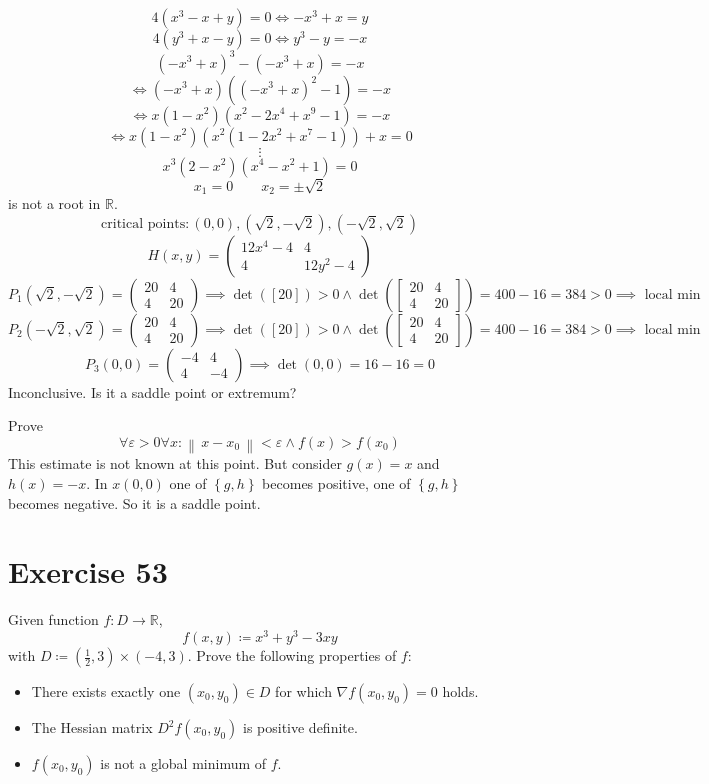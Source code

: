 \documentclass[a4paper]{article}
\theoremstyle{definition}
\newcommand\norm[1]{\left\|\,#1\,\right\|}
\newcommand\set[1]{\left\{#1\right\}}
\begin{document}
\[ 4(x^3 - x + y) = 0 \iff -x^3 + x = y \]
\[ 4(y^3 + x - y) = 0 \iff y^3 - y = -x \]
\[ (-x^3 + x)^3 - (-x^3 + x) = -x \]
\[ \iff (-x^3 + x) ((-x^3 + x)^2 - 1) = -x \]
\[ \iff x (1 - x^2) (x^2 - 2x^4 + x^9 - 1) = -x \]
\[ \iff x (1 - x^2) (x^2 (1 - 2x^2 + x^7 - 1)) + x = 0 \]
\[ \vdots \]
\[ x^3 (2 - x^2) (x^4 - x^2 + 1) = 0 \]
\[ x_1 = 0 \qquad x_2 = \pm \sqrt{2} \]
is not a root in $\mathbb R$.
\[ \text{critical points}: (0, 0), (\sqrt{2}, -\sqrt{2}), (-\sqrt{2}, \sqrt{2}) \]
\[ H(x,y) = \begin{pmatrix} 12x^4 - 4 & 4 \\ 4 & 12y^2 - 4 \end{pmatrix} \]
\[ P_1(\sqrt2, -\sqrt2) = \begin{pmatrix} 20 & 4 \\ 4 & 20 \end{pmatrix} \implies \det([20]) > 0 \land \det\left(\begin{bmatrix} 20 & 4 \\ 4 & 20 \end{bmatrix}\right) = 400 - 16 = 384 > 0 \implies \text{ local min} \]
\[ P_2(-\sqrt2, \sqrt2) = \begin{pmatrix} 20 & 4 \\ 4 & 20 \end{pmatrix} \implies \det([20]) > 0 \land \det\left(\begin{bmatrix} 20 & 4 \\ 4 & 20 \end{bmatrix}\right) = 400 - 16 = 384 > 0 \implies \text{ local min} \]
\[ P_3(0, 0) = \begin{pmatrix} -4 & 4 \\ 4 & -4 \end{pmatrix} \implies \det(0,0) = 16 - 16 = 0 \]
Inconclusive. Is it a saddle point or extremum?

Prove
\[ \forall \varepsilon > 0 \forall x: \norm{x - x_0} < \varepsilon \land f(x) > f(x_0) \]
This estimate is not known at this point.
But consider $g(x) = x$ and $h(x) = -x$. In $x(0, 0)$ one of $\set{g,h}$ becomes positive, one of $\set{g,h}$ becomes negative.
So it is a saddle point.

\section{Exercise 53}
\begin{ex}
  Given function $f: D \to \mathbb R$,
  \[ f(x,y) \coloneqq x^3 + y^3 - 3xy \]
  with $D \coloneqq (\frac12, 3) \times (-4,3)$. Prove the following properties of $f$:
  \begin{itemize}
  \item There exists exactly one $(x_0, y_0) \in D$ for which $\nabla f(x_0,y_0) = 0$ holds.
  \item The Hessian matrix $D^2 f(x_0,y_0)$ is positive definite.
  \item $f(x_0, y_0)$ is not a global minimum of $f$.
  \end{itemize}
\end{ex}
\end{document}
